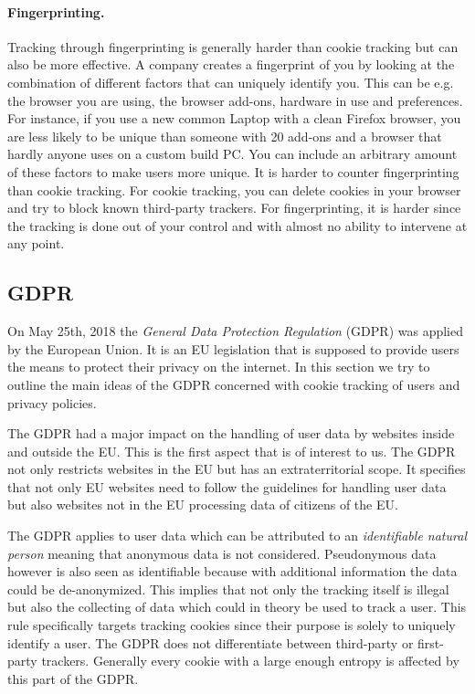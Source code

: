 \paragraph{Fingerprinting.}

Tracking through fingerprinting is generally harder than cookie tracking but can also be more effective. A company
creates a fingerprint of you by looking at the combination of different factors that can uniquely identify you. This can
be e.g. the browser you are using, the browser add-ons, hardware in use and preferences. For instance, if you use a new
common Laptop with a clean Firefox browser, you are less
likely to be unique than someone with 20 add-ons and a browser that hardly anyone uses on a custom build PC.
You can include an arbitrary amount of these factors to make users more unique. It is harder to counter fingerprinting
than cookie tracking. For cookie tracking, you can delete cookies in your browser and try to block known third-party
trackers. For fingerprinting, it is harder since the tracking is done out of your control and with almost no ability to
intervene at any point.

\subsection{GDPR}

On May 25th, 2018 the \emph{General Data Protection Regulation} (GDPR) was applied by the European Union. It is an EU
legislation that is supposed to provide users the means to protect their privacy on the internet. In this section we try
to outline the main ideas of the GDPR concerned with cookie tracking of users and privacy policies.

The GDPR had a major impact on the handling of user data by websites inside and outside the EU. This is the first
aspect that is of interest to us. The GDPR not only restricts websites in the EU but has an extraterritorial scope.
It specifies that not only EU websites need to follow the guidelines for handling user data but also websites not in the
EU processing data of citizens of the EU.

The GDPR applies to user data which can be attributed to an \emph{identifiable natural person} meaning that anonymous
data is not considered. Pseudonymous data however is also seen as identifiable because with additional information
the data could be de-anonymized. This implies that not only the tracking itself is illegal but also the collecting of data
which could in theory be used to track a user. This rule specifically targets tracking cookies since their purpose is
solely to uniquely identify a user. The GDPR does not differentiate between third-party or first-party trackers.
Generally every cookie with a large enough entropy is affected by this part of the GDPR.

